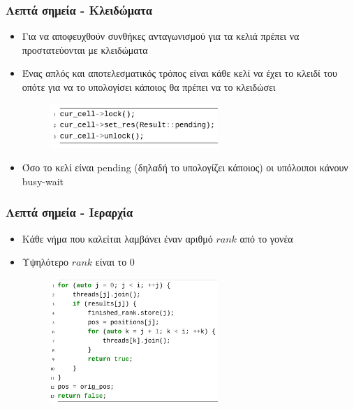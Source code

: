 \documentclass{beamer}
\begin{document}
\begin{frame}
  \frametitle{Λεπτά σημεία - Κλειδώματα}

  \begin{itemize}
	\item Για να αποφευχθούν συνθήκες ανταγωνισμού για τα κελιά πρέπει να προστατεύονται με κλειδώματα
	\item Ένας απλός και αποτελεσματικός τρόπος είναι κάθε κελί να έχει το κλειδί του οπότε για να το υπολογίσει κάποιος θα πρέπει να το κλειδώσει \pause

\begin{figure}[h]
    \centering
	\includegraphics[width=0.60\textwidth]{pics/lock}
\end{figure} \pause
\item Όσο το κελί είναι pending (δηλαδή το υπολογίζει κάποιος) οι υπόλοιποι κάνουν busy-wait
  \end{itemize}
\end{frame}

\begin{frame}
  \frametitle{Λεπτά σημεία - Ιεραρχία}

  \begin{itemize}
	\item Κάθε νήμα που καλείται λαμβάνει έναν αριθμό $rank$ από το γονέα
	\item Υψηλότερο $rank$ είναι το $0$ \pause

\begin{figure}[h]
    \centering
	\includegraphics[width=0.60\textwidth]{pics/hierarchy}
\end{figure} 
  \end{itemize}
\end{frame}
\end{document}
